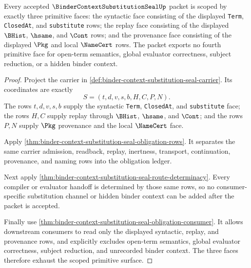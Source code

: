 \begin{theorem}
\label{thm:binder-context-substitution-seal-scope-triad}
Every accepted $\BinderContextSubstitutionSealUp$ packet is scoped by exactly
three primitive faces: the syntactic face consisting of the displayed
\texttt{Term}, \texttt{ClosedAt}, and \texttt{substitute} rows; the replay
face consisting of the displayed $\BHist$, $\hsame$, and $\Cont$ rows; and the
provenance face consisting of the displayed $\Pkg$ and local $\NameCert$ rows.
The packet exports no fourth primitive face for open-term semantics, global
evaluator correctness, subject reduction, or a hidden binder context.
\end{theorem}
\begin{proof}
Project the carrier in \autoref{def:binder-context-substitution-seal-carrier}.
Its coordinates are exactly
$$
S=(t,d,v,s,b,H,C,P,N).
$$
The rows $t,d,v,s,b$ supply the syntactic \texttt{Term}, \texttt{ClosedAt}, and
\texttt{substitute} face; the rows $H,C$ supply replay through $\BHist$,
$\hsame$, and $\Cont$; and the rows $P,N$ supply $\Pkg$ provenance and the
local $\NameCert$ face.

Apply \autoref{thm:binder-context-substitution-seal-obligation-rows}. It
separates the same carrier admission, readback, replay, inertness, transport,
continuation, provenance, and naming rows into the obligation ledger.

Next apply \autoref{thm:binder-context-substitution-seal-route-determinacy}.
Every compiler or evaluator handoff is determined by those same rows, so no
consumer-specific substitution channel or hidden binder context can be added
after the packet is accepted.

Finally use
\autoref{thm:binder-context-substitution-seal-obligation-consumer}. It allows
downstream consumers to read only the displayed syntactic, replay, and
provenance rows, and explicitly excludes open-term semantics, global evaluator
correctness, subject reduction, and unrecorded binder context. The three
faces therefore exhaust the scoped primitive surface.
\end{proof}


